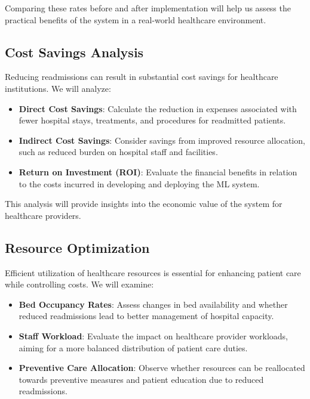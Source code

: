 \documentclass{article}
\begin{document}
Comparing these rates before and after implementation will help us assess the practical benefits of the system in a real-world healthcare environment.

\subsection{Cost Savings Analysis}

Reducing readmissions can result in substantial cost savings for healthcare institutions. We will analyze:

\begin{itemize}[leftmargin=*]
    \item \textbf{Direct Cost Savings}: Calculate the reduction in expenses associated with fewer hospital stays, treatments, and procedures for readmitted patients.
    \item \textbf{Indirect Cost Savings}: Consider savings from improved resource allocation, such as reduced burden on hospital staff and facilities.
    \item \textbf{Return on Investment (ROI)}: Evaluate the financial benefits in relation to the costs incurred in developing and deploying the ML system.
\end{itemize}

This analysis will provide insights into the economic value of the system for healthcare providers.

\subsection{Resource Optimization}

Efficient utilization of healthcare resources is essential for enhancing patient care while controlling costs. We will examine:

\begin{itemize}[leftmargin=*]
    \item \textbf{Bed Occupancy Rates}: Assess changes in bed availability and whether reduced readmissions lead to better management of hospital capacity.
    \item \textbf{Staff Workload}: Evaluate the impact on healthcare provider workloads, aiming for a more balanced distribution of patient care duties.
    \item \textbf{Preventive Care Allocation}: Observe whether resources can be reallocated towards preventive measures and patient education due to reduced readmissions.
\end{itemize}
\end{document}

